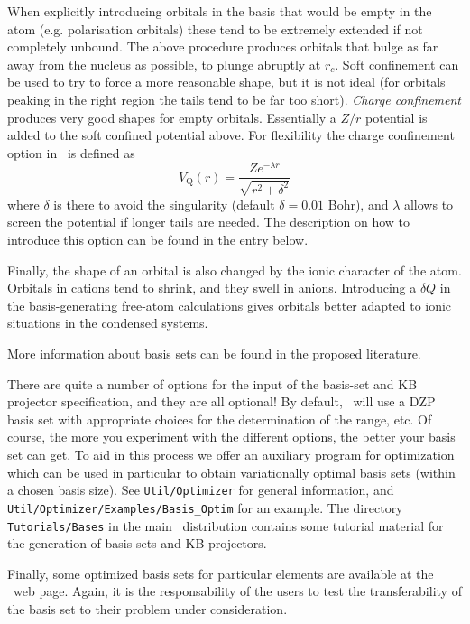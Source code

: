 When explicitly introducing orbitals in the basis that would be empty in 
the atom (e.g. polarisation orbitals) these tend to be extremely 
extended if not completely unbound. The above procedure produces
orbitals that bulge as far away from the nucleus as possible, to 
plunge abruptly at $r_c$. Soft confinement can be used to try
to force a more reasonable shape, but it is not ideal (for orbitals
peaking in the right region the tails tend to be far too short).
\textit{Charge confinement}  produces
very good shapes for empty orbitals. Essentially a $Z/r$ potential
is added to the soft confined potential above. For flexibility
the charge confinement option in \siesta\ is defined as
\begin{equation}
  V_{\mathrm Q}(r) = \frac{Z e^{-\lambda r}}{\sqrt{r^2 + \delta^2}}
\end{equation}
where $\delta$ is there to avoid the singularity (default $\delta=0.01$ Bohr),
and $\lambda$ allows to screen the potential if longer tails are needed.
The description on how to introduce this option can be found in
the  entry below.

Finally, the shape of an orbital is also changed by the ionic
character of the atom.  Orbitals in cations tend to shrink, and they
swell in anions.  Introducing a $\delta Q$ in the basis-generating
free-atom calculations gives orbitals better adapted to ionic
situations in the condensed systems.

More information about basis sets can be found in the proposed
literature.


\noindent

There are quite a number of options for the input of the basis-set and
KB projector specification, and they are all optional! By default,
\siesta\ will use a DZP basis set with appropriate choices for the
determination of the range, etc. Of course, the more you experiment
with the different options, the better your basis set can get. To aid
in this process we offer an auxiliary program for optimization which
can be used in particular to obtain variationally optimal basis sets
(within a chosen basis size). See \texttt{Util/Optimizer}
for general information, and \texttt{Util/Optimizer/Examples/Basis\_Optim}
for an example. The directory \texttt{Tutorials/Bases} in the main \siesta\
distribution contains some tutorial material for the generation of
basis sets and KB projectors.

Finally, some optimized basis sets for particular elements are
available at the \siesta\ web page.  Again, it is the
responsability of the users to test the transferability of the basis
set to their problem under consideration.



